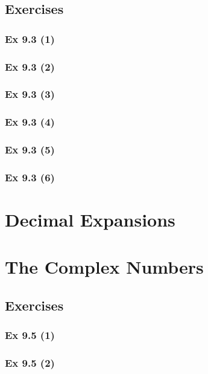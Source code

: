 \subsection{Exercises}\label{sec:9.3_Exercises}

\subsubsection{Ex 9.3 (1)}\label{sec:Ex_9.3.1}

\subsubsection{Ex 9.3 (2)}\label{sec:Ex_9.3.2}

\subsubsection{Ex 9.3 (3)}\label{sec:Ex_9.3.3}

\subsubsection{Ex 9.3 (4)}\label{sec:Ex_9.3.4}

\subsubsection{Ex 9.3 (5)}\label{sec:Ex_9.3.5}

\subsubsection{Ex 9.3 (6)}\label{sec:Ex_9.3.6}

\newpage		%

\section{Decimal Expansions}\label{sec:9.4}

\newpage		%

\section{The Complex Numbers}\label{sec:9.5}
\subsection{Exercises}\label{sec:9.5_Exercises}

\subsubsection{Ex 9.5 (1)}\label{sec:Ex_9.5.1}

\subsubsection{Ex 9.5 (2)}\label{sec:Ex_9.5.2}


